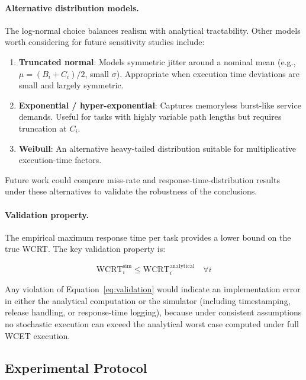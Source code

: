 \documentclass[12pt,a4paper]{article}
\begin{document}
\paragraph{Alternative distribution models.}
The log-normal choice balances realism with analytical tractability. Other models worth considering for future sensitivity studies include:
\begin{enumerate}
    \item \textbf{Truncated normal}: Models symmetric jitter around a nominal mean (e.g., \(\mu = (B_i + C_i)/2\), small \(\sigma\)). Appropriate when execution time deviations are small and largely symmetric.
    \item \textbf{Exponential / hyper-exponential}: Captures memoryless burst-like service demands. Useful for tasks with highly variable path lengths but requires truncation at \(C_i\).
    \item \textbf{Weibull}: An alternative heavy-tailed distribution suitable for multiplicative execution-time factors.
\end{enumerate}
Future work could compare miss-rate and response-time-distribution results under these alternatives to validate the robustness of the conclusions.

\paragraph{Validation property.}
The empirical maximum response time per task provides a lower bound on the true WCRT. The key validation property is:

\begin{equation}
    \text{WCRT}_i^{\text{sim}} \leq \text{WCRT}_i^{\text{analytical}} \quad \forall i
    \label{eq:validation}
\end{equation}

Any violation of Equation~\ref{eq:validation} would indicate an implementation error in either the analytical computation or the simulator (including timestamping, release handling, or response-time logging), because under consistent assumptions no stochastic execution can exceed the analytical worst case computed under full WCET execution.

\subsection{Experimental Protocol}
\end{document}
